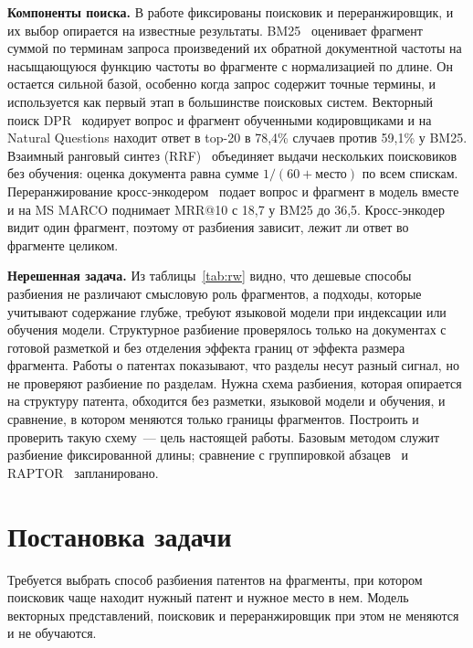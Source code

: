 \documentclass{article}
\begin{document}
\textbf{Компоненты поиска.}
В работе фиксированы поисковик и переранжировщик, и их выбор опирается на известные результаты. BM25~\citep{robertson2009bm25} оценивает фрагмент суммой по терминам запроса произведений их обратной документной частоты на насыщающуюся функцию частоты во фрагменте с нормализацией по длине. Он остается сильной базой, особенно когда запрос содержит точные термины, и используется как первый этап в большинстве поисковых систем. Векторный поиск DPR~\citep{karpukhin2020dpr} кодирует вопрос и фрагмент обученными кодировщиками и на Natural Questions находит ответ в top-20 в 78,4\% случаев против 59,1\% у BM25. Взаимный ранговый синтез (RRF)~\citep{cormack2009rrf} объединяет выдачи нескольких поисковиков без обучения: оценка документа равна сумме $1/(60 + \text{место})$ по всем спискам. Переранжирование кросс-энкодером~\citep{nogueira2019passage} подает вопрос и фрагмент в модель вместе и на MS MARCO поднимает MRR@10 с 18,7 у BM25 до 36,5. Кросс-энкодер видит один фрагмент, поэтому от разбиения зависит, лежит ли ответ во фрагменте целиком.

\textbf{Нерешенная задача.}
Из таблицы~\ref{tab:rw} видно, что дешевые способы разбиения не различают смысловую роль фрагментов, а подходы, которые учитывают содержание глубже, требуют языковой модели при индексации или обучения модели. Структурное разбиение проверялось только на документах с готовой разметкой и без отделения эффекта границ от эффекта размера фрагмента. Работы о патентах показывают, что разделы несут разный сигнал, но не проверяют разбиение по разделам. Нужна схема разбиения, которая опирается на структуру патента, обходится без разметки, языковой модели и обучения, и сравнение, в котором меняются только границы фрагментов. Построить и проверить такую схему~--- цель настоящей работы. Базовым методом служит разбиение фиксированной длины; сравнение с группировкой абзацев~\citep{shaukat2026chunking} и RAPTOR~\citep{sarthi2024raptor} запланировано.

\section{Постановка задачи}\label{sec:prelim}

Требуется выбрать способ разбиения патентов на фрагменты, при котором поисковик чаще находит нужный патент и нужное место в нем. Модель векторных представлений, поисковик и переранжировщик при этом не меняются и не обучаются.
\end{document}
